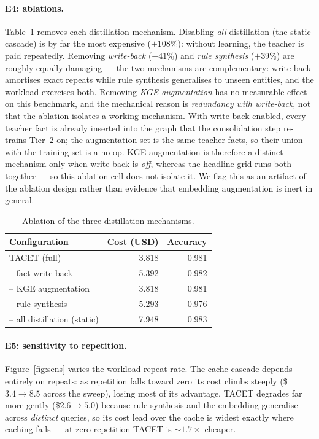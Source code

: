 \documentclass[11pt]{article}
\theoremstyle{plain}
\begin{document}
\paragraph{E4: ablations.} Table~\ref{tab:ablation} removes each
distillation mechanism. Disabling \emph{all} distillation (the static
cascade) is by far the most expensive ($+108$\%): without learning, the
teacher is paid repeatedly. Removing \emph{write-back} ($+41$\%) and
\emph{rule synthesis} ($+39$\%) are roughly equally damaging --- the two
mechanisms are complementary: write-back amortises exact repeats while
rule synthesis generalises to unseen entities, and the workload exercises
both. Removing \emph{KGE augmentation} has no measurable effect on this
benchmark, and the mechanical reason is \emph{redundancy with write-back},
not that the ablation isolates a working mechanism. With write-back
enabled, every teacher fact is already inserted into the graph that the
consolidation step re-trains Tier~2 on; the augmentation set is the same
teacher facts, so their union with the training set is a no-op. KGE
augmentation is therefore a distinct mechanism only when write-back is
\emph{off}, whereas the headline grid runs both together --- so this
ablation cell does not isolate it. We flag this as an artifact of the
ablation design rather than evidence that embedding augmentation is inert
in general.

\begin{table}[t]
\centering
\caption{Ablation of the three distillation mechanisms.}
\label{tab:ablation}
\begin{tabular}{lrr}
\toprule
Configuration & Cost (USD) & Accuracy \\
\midrule
TACET (full) & 3.818 & 0.981 \\
-- fact write-back & 5.392 & 0.982 \\
-- KGE augmentation & 3.818 & 0.981 \\
-- rule synthesis & 5.293 & 0.976 \\
-- all distillation (static) & 7.948 & 0.983 \\
\bottomrule
\end{tabular}
\end{table}

\paragraph{E5: sensitivity to repetition.} Figure~\ref{fig:sens} varies the
workload repeat rate. The cache cascade depends entirely on repeats: as
repetition falls toward zero its cost climbs steeply (\$\(3.4\!\to\!8.5\)
across the sweep), losing most of its advantage. TACET degrades far more
gently (\$\(2.6\!\to\!5.0\)) because rule synthesis and the embedding
generalise across \emph{distinct} queries, so its cost lead over the cache
is widest exactly where caching fails --- at zero repetition TACET is
${\sim}1.7\times$ cheaper.
\end{document}
